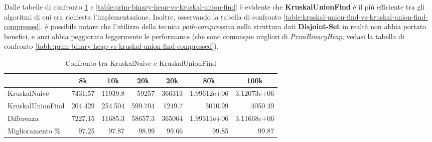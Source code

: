 \noindent Dalle tabelle di confronto \ref{table:kruskal-simple-vs-kruskal-union-find} e \ref{table:prim-binary-heap-vs-kruskal-union-find} è evidente che \textbf{KruskalUnionFind} è il più efficiente tra gli algoritmi di cui era richiesta l'implementazione. Inoltre, osservando la tabella di confronto \ref{table:kruskal-union-find-vs-kruskal-union-find-compressed}, è possibile notare che l'utilizzo della tecnica \textit{path-compression} nella struttura dati \textbf{Disjoint-Set} in realtà non abbia portato benefici, e anzi abbia peggiorato leggermente le performance (che sono comunque migliori di \textit{PrimBinaryHeap}, vedasi la tabella di confronto \ref{table:prim-binary-heap-vs-kruskal-union-find-compressed}). \\

\begin{table}[H]
\centering
    \begin{tabular}{|l|rrrrrr|}
    \hline
    &  \multicolumn{1}{c}{8k} & \multicolumn{1}{c}{10k} & \multicolumn{1}{c}{20k} & \multicolumn{1}{c}{20k} & \multicolumn{1}{c}{80k} &           \multicolumn{1}{c|}{100k} \\
    \hline
     KruskalNaive     & 7431.57  & 11939.8   & 59257     & 366313    &    1.99612e+06 &    3.12073e+06 \\
     KruskalUnionFind &  204.429 &   254.504 &   599.704 &   1249.7  & 3010.99        & 4050.49        \\ \hline
     Differenza       & 7227.15  & 11685.3   & 58657.3   & 365064    &    1.99311e+06 &    3.11668e+06 \\
     Miglioramento \%    &   97.25  &    97.87  &    98.99  &     99.66 &   99.85        &   99.87        \\
    \hline
    \end{tabular}
    \caption{Confronto tra KruskalNaive e KruskalUnionFind}
    \label{table:kruskal-simple-vs-kruskal-union-find}
\end{table}

